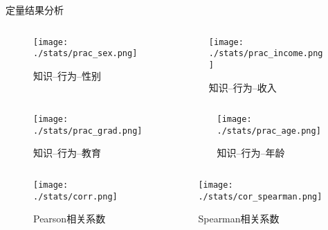 \begin{frame}[allowframebreaks]{定量结果分析}
    \begin{columns}
    \begin{column}{0.5\textwidth}
        \begin{figure}[h]
            \caption{知识--行为--性别}
            \texttt{[image: ./stats/prac\_sex.png]}
            
        \end{figure}
        
    \end{column}
    \begin{column}{0.5\textwidth}
        \begin{figure}[h]
            \caption{知识--行为--收入}
            \texttt{[image: ./stats/prac\_income.png]}
            
        \end{figure}
    \end{column}
\end{columns}

    \begin{columns}
    \begin{column}{0.5\textwidth}
        \begin{figure}[h]
            \caption{知识--行为--教育}
            \texttt{[image: ./stats/prac\_grad.png]}
            
        \end{figure}
        
    \end{column}
    \begin{column}{0.5\textwidth}
        \begin{figure}[h] 
            \caption{知识--行为--年龄}
            \texttt{[image: ./stats/prac\_age.png]}
        \end{figure}
    \end{column}
\end{columns}
    \begin{columns}
    \begin{column}{0.6\textwidth}
        \begin{figure}[h]
            \texttt{[image: ./stats/corr.png]}
            \caption{Pearson相关系数}
        \end{figure}
    \end{column}
    \begin{column}{0.6\textwidth}
        \begin{figure}[h]
            \texttt{[image: ./stats/cor\_spearman.png]}
            \caption{Spearman相关系数}
        \end{figure} 
    \end{column}
\end{columns}


\end{frame}
